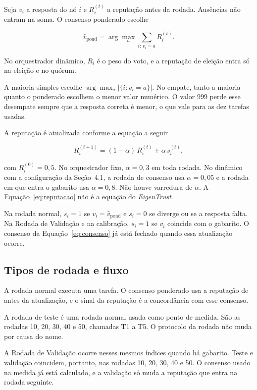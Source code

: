 \documentclass[12pt]{article}
\begin{document}
Seja $v_i$ a resposta do nó $i$ e $R_i^{(t)}$ a reputação antes da rodada. Ausências não entram na soma. O consenso ponderado escolhe

\begin{equation}
\label{eq:consenso}
\hat{v}_{\mathrm{pond}} = \arg\max_{a} \sum_{i:\, v_i = a} R_i^{(t)}.
\end{equation}

No orquestrador dinâmico, $R_i$ é o peso do voto, e a reputação de eleição entra só na eleição e no quórum.

A maioria simples escolhe $\arg\max_{a} |\{i: v_i = a\}|$. No empate, tanto a maioria quanto o ponderado escolhem o menor valor numérico. O valor $999$ perde esse desempate sempre que a resposta correta é menor, o que vale para as dez tarefas usadas.

A reputação é atualizada conforme a equação a seguir

\begin{equation}
\label{eq:reputacao}
R_i^{(t+1)} = (1-\alpha)\, R_i^{(t)} + \alpha\, s_i^{(t)},
\end{equation}

com $R_i^{(0)} = 0{,}5$. No orquestrador fixo, $\alpha = 0{,}3$ em toda rodada. No dinâmico com a configuração da Seção~4.1, a rodada de consenso usa $\alpha = 0{,}05$ e a rodada em que entra o gabarito usa $\alpha = 0{,}8$. Não houve varredura de $\alpha$. A Equação~\ref{eq:reputacao} não é a equação do \textit{EigenTrust}.

Na rodada normal, $s_i = 1$ se $v_i = \hat{v}_{\mathrm{pond}}$ e $s_i = 0$ se diverge ou se a resposta falta. Na Rodada de Validação e na calibração, $s_i = 1$ se $v_i$ coincide com o gabarito. O consenso da Equação~\ref{eq:consenso} já está fechado quando essa atualização ocorre.

\subsection{Tipos de rodada e fluxo}

A rodada normal executa uma tarefa. O consenso ponderado usa a reputação de antes da atualização, e o sinal da reputação é a concordância com esse consenso.

A rodada de teste é uma rodada normal usada como ponto de medida. São as rodadas 10, 20, 30, 40 e 50, chamadas T1 a T5. O protocolo da rodada não muda por causa do nome.

A Rodada de Validação ocorre nesses mesmos índices quando há gabarito. Teste e validação coincidem, portanto, nas rodadas 10, 20, 30, 40 e 50. O consenso usado na medida já está calculado, e a validação só muda a reputação que entra na rodada seguinte.
\end{document}
